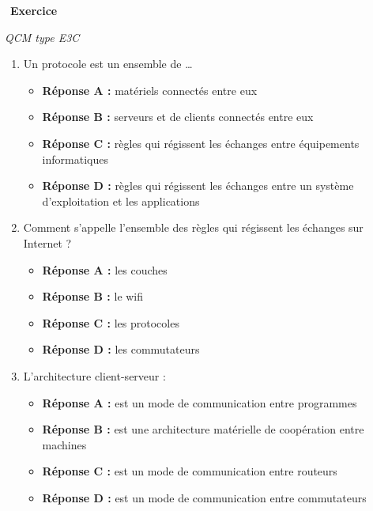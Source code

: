 \documentclass[
  11pt,
]{article}
\providecommand{\tightlist}{%
  \setlength{\itemsep}{0pt}\setlength{\parskip}{0pt}}
\newcounter{exo}
\newenvironment{exercice}[1]
{\par \medskip   \addtocounter{exo}{1} \noindent  
\begin{bclogo}[arrondi =0.1,   noborder = true, logo=\bccrayon, marge=4]{~\textbf{Exercice} \textbf{\theexo} {\itshape #1} }  \par}
{
\end{bclogo}
 \par \bigskip }
\newcounter{def}
\newcounter{prog}
\begin{document}
\begin{exercice}{}

\emph{QCM type E3C}

\begin{enumerate}
\def\labelenumi{\arabic{enumi}.}
\item
  Un protocole est un ensemble de \ldots{}

  \begin{itemize}
  \tightlist
  \item
    \textbf{Réponse A :} matériels connectés entre eux
  \item
    \textbf{Réponse B :} serveurs et de clients connectés entre eux
  \item
    \textbf{Réponse C :} règles qui régissent les échanges entre
    équipements informatiques
  \item
    \textbf{Réponse D :} règles qui régissent les échanges entre un
    système d'exploitation et les applications
  \end{itemize}
\item
  Comment s'appelle l'ensemble des règles qui régissent les échanges sur
  Internet ?

  \begin{itemize}
  \tightlist
  \item
    \textbf{Réponse A :} les couches
  \item
    \textbf{Réponse B :} le wifi
  \item
    \textbf{Réponse C :} les protocoles
  \item
    \textbf{Réponse D :} les commutateurs
  \end{itemize}
\item
  L'architecture client-serveur :

  \begin{itemize}
  \tightlist
  \item
    \textbf{Réponse A :} est un mode de communication entre programmes
  \item
    \textbf{Réponse B :} est une architecture matérielle de coopération
    entre machines
  \item
    \textbf{Réponse C :} est un mode de communication entre routeurs
  \item
    \textbf{Réponse D :} est un mode de communication entre commutateurs
  \end{itemize}
\end{enumerate}

\end{exercice}
\end{document}
